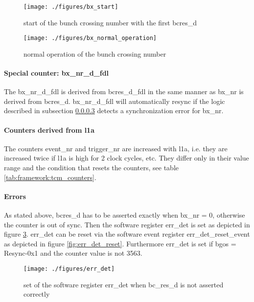 \begin{figure}[ht]
  \texttt{[image: ./figures/bx\_start]}
  \caption{start of the bunch crossing number with the first bcres\_d}
  \label{fig:bx_start}
\end{figure}

\begin{figure}[ht]
  \texttt{[image: ./figures/bx\_normal\_operation]}
  \caption{normal operation of the bunch crossing number}
  \label{fig:bx_normal_operation}
\end{figure}

\paragraph{Special counter: bx\_nr\_d\_fdl}
The bx\_nr\_d\_fdl is derived from bcres\_d\_fdl in the same manner as bx\_nr is derived from bcres\_d. bx\_nr\_d\_fdl will automatically resync if the logic described in subsection \ref{subsec:framework:tcmerrors} detects a synchronization error for bx\_nr.

\paragraph{Counters derived from l1a}
The counters event\_nr and trigger\_nr are increased with l1a, i.e. they are increased twice if l1a is high for 2 clock cycles, etc. They differ only in their value range and the condition that resets the counters, see table \ref{tab:framework:tcm_counters}.

\paragraph{Errors}\label{subsec:framework:tcmerrors}
As stated above, bcres\_d has to be asserted exactly when bx\_nr = 0, otherwise the counter is out of sync. Then the software register err\_det is set as depicted in figure \ref{fig:err_det}. err\_det can be reset via the software event register err\_det\_reset\_event as depicted in figure \ref{fig:err_det_reset}. Furthermore err\_det is set if bgos = Resync-0x1 and the counter value is not 3563.

\begin{figure}[ht]
  \texttt{[image: ./figures/err\_det]}
  \caption{set of the software register err\_det when bc\_res\_d is not asserted correctly}
  \label{fig:err_det}
\end{figure}

